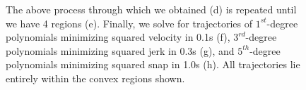\begin{figure}[t]
	\hfill
	\hfill
	\hfill
	\hfill
	\hfill
	
	
	\caption{\label{fig: figs-4b}The above process through which we obtained (d) is repeated until we have 4 regions (e). Finally, we solve for trajectories of $1^{st}$-degree polynomials minimizing squared velocity in 0.1s (f), $3^{rd}$-degree polynomials minimizing squared jerk in 0.3s (g), and
		$5^{th}$-degree polynomials minimizing squared snap in 1.0s (h). All trajectories lie entirely within the convex regions shown.}
\end{figure}
